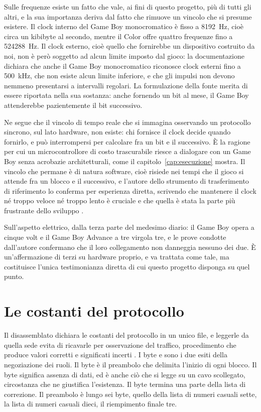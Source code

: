 Sulle frequenze esiste un fatto che vale, ai fini di questo progetto, più di tutti gli altri, e la sua importanza deriva dal fatto che rimuove un vincolo che si presume esistere. Il clock interno del Game Boy monocromatico è fisso a 8192~Hz, cioè circa un kibibyte al secondo, mentre il Color offre quattro frequenze fino a 524288~Hz. Il clock esterno, cioè quello che fornirebbe un dispositivo costruito da noi, non è però soggetto ad alcun limite imposto dal gioco: la documentazione dichiara che anche il Game Boy monocromatico riconosce clock esterni fino a 500~kHz, che non esiste alcun limite inferiore, e che gli impulsi non devono nemmeno presentarsi a intervalli regolari. La formulazione della fonte merita di essere riportata nella sua sostanza: anche fornendo un bit al mese, il Game Boy attenderebbe pazientemente il bit successivo.

Ne segue che il vincolo di tempo reale che si immagina osservando un protocollo sincrono, sul lato hardware, non esiste: chi fornisce il clock decide quando fornirlo, e può interrompersi per calcolare fra un bit e il successivo. È la ragione per cui un microcontrollore di costo trascurabile riesce a dialogare con un Game Boy senza acrobazie architetturali, come il capitolo~\ref{cap:esecuzione} mostra. Il vincolo che permane è di natura software, cioè risiede nei tempi che il gioco si attende fra un blocco e il successivo, e l'autore dello strumento di trasferimento di riferimento lo conferma per esperienza diretta, scrivendo che mantenere il clock né troppo veloce né troppo lento è cruciale e che quella è stata la parte più frustrante dello sviluppo \cite{devlog-ptgb}.

Sull'aspetto elettrico, dalla terza parte del medesimo diario: il Game Boy opera a cinque volt e il Game Boy Advance a tre virgola tre, e le prove condotte dall'autore confermano che il loro collegamento non danneggia nessuno dei due. È un'affermazione di terzi su hardware proprio, e va trattata come tale, ma costituisce l'unica testimonianza diretta di cui questo progetto disponga su quel punto.

\section{Le costanti del protocollo}

Il disassemblato dichiara le costanti del protocollo in un unico file, e leggerle da quella sede evita di ricavarle per osservazione del traffico, procedimento che produce valori corretti e significati incerti \cite{pokered}. I byte  e  sono i due esiti della negoziazione dei ruoli. Il byte  è il preambolo che delimita l'inizio di ogni blocco. Il byte  significa assenza di dati, ed è anche ciò che si legge su un cavo scollegato, circostanza che ne giustifica l'esistenza. Il byte  termina una parte della lista di correzione. Il preambolo è lungo sei byte, quello della lista di numeri casuali sette, la lista di numeri casuali dieci, il riempimento finale tre.

